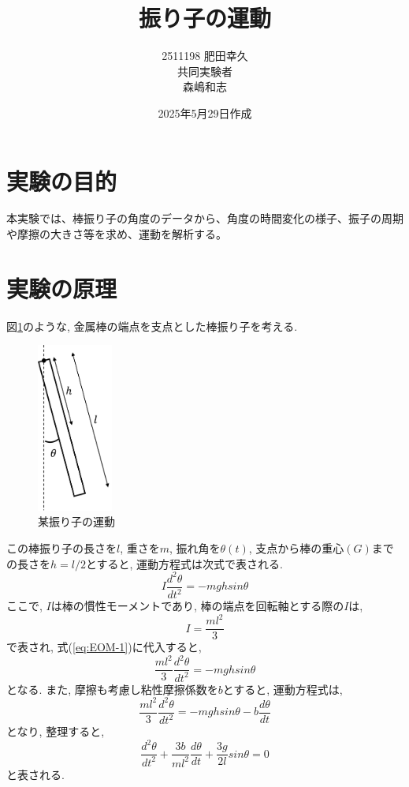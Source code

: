 \documentclass{jarticle}
\title{振り子の運動}
\author{2511198 肥田幸久 \\ 共同実験者 \\ 森嶋和志}
\date{2025年5月29日作成}
\begin{document}
\maketitle



\section{実験の目的}

本実験では、棒振り子の角度のデータから、角度の時間変化の様子、振子の周期
や摩擦の大きさ等を求め、運動を解析する。



\section{実験の原理}

図\ref{fg:rod-pendulum}のような, 金属棒の端点を支点とした棒振り子を考える.

\begin{figure}[H]
  \begin{center}
    \includegraphics[width=25mm]{rod_pendulum_picture.png}
    \caption{某振り子の運動}
    \label{fg:rod-pendulum}
  \end{center}
\end{figure}

この棒振り子の長さを$l$, 重さを$m$, 振れ角を$\theta(t)$, 支点から棒の重心$(G)$までの長さを$h=l/2$とすると, 運動方程式は次式で表される.
\begin{equation}
  I\frac{d^2\theta}{dt^2}=-mghsin\theta
  \label{eq:EOM-1}
\end{equation}
ここで, $I$は棒の慣性モーメントであり, 棒の端点を回転軸とする際の$I$は,
\begin{equation}
  I=\frac{ml^2}{3}
  \label{eq:MOI}
\end{equation}
で表され, 式(\ref{eq:EOM-1})に代入すると,
\begin{equation}
  \frac{ml^2}{3}\frac{d^2\theta}{dt^2}=-mghsin\theta
  \label{eq:EOM-1.1}
\end{equation}
となる.
また, 摩擦も考慮し粘性摩擦係数を$b$とすると, 運動方程式は,
\begin{equation}
  \frac{ml^2}{3}\frac{d^2\theta}{dt^2}=-mghsin\theta-b\frac{d\theta}{dt}
  \label{eq:EOM-2}
\end{equation}
となり, 整理すると,
\begin{equation}
  \frac{d^2\theta}{dt^2}+\frac{3b}{ml^2}\frac{d\theta}{dt}+\frac{3g}{2l}sin\theta=0
  \label{eq:EOM-2.1}
\end{equation}
と表される.
\end{document}
